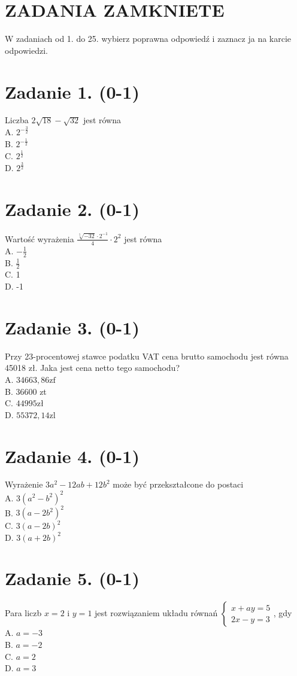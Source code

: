 \documentclass[10pt]{article}
\begin{document}
\section*{ZADANIA ZAMKNIETE}
W zadaniach od 1. do 25. wybierz poprawna odpowiedź i zaznacz ja na karcie odpowiedzi.

\section*{Zadanie 1. (0-1)}
Liczba \(2 \sqrt{18}-\sqrt{32}\) jest równa\\
A. \(2^{-\frac{3}{2}}\)\\
B. \(2^{-\frac{1}{2}}\)\\
C. \(2^{\frac{1}{2}}\)\\
D. \(2^{\frac{3}{2}}\)

\section*{Zadanie 2. (0-1)}
Wartość wyrażenia \(\frac{\sqrt[5]{-32} \cdot 2^{-1}}{4} \cdot 2^{2}\) jest równa\\
A. \(-\frac{1}{2}\)\\
B. \(\frac{1}{2}\)\\
C. 1\\
D. -1

\section*{Zadanie 3. (0-1)}
Przy 23-procentowej stawce podatku VAT cena brutto samochodu jest równa 45018 zł. Jaka jest cena netto tego samochodu?\\
A. \(34663,86 \mathrm{zf}\)\\
B. 36600 zt\\
C. \(44995 \mathrm{zł}\)\\
D. \(55372,14 \mathrm{zl}\)

\section*{Zadanie 4. (0-1)}
Wyrażenie \(3 a^{2}-12 a b+12 b^{2}\) może być przekształcone do postaci\\
A. \(3\left(a^{2}-b^{2}\right)^{2}\)\\
B. \(3\left(a-2 b^{2}\right)^{2}\)\\
C. \(3(a-2 b)^{2}\)\\
D. \(3(a+2 b)^{2}\)

\section*{Zadanie 5. (0-1)}
Para liczb \(x=2\) i \(y=1\) jest rozwiązaniem układu równań \(\left\{\begin{array}{l}x+a y=5 \\ 2 x-y=3\end{array}\right.\), gdy\\
A. \(a=-3\)\\
B. \(a=-2\)\\
C. \(a=2\)\\
D. \(a=3\)
\end{document}
